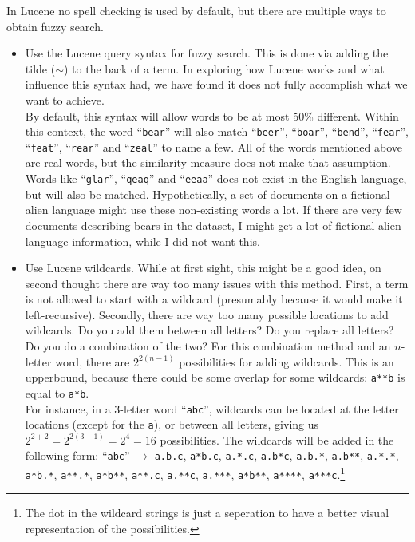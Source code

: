 \documentclass[11pt]{article}
\begin{document}
In Lucene no spell checking is used by default, but there are multiple ways to obtain fuzzy search.
\begin{itemize}
    \item Use the Lucene query syntax for fuzzy search. This is done via adding the tilde ($\sim$) to the back of a term. In exploring how Lucene works and what influence this syntax had, we have found it does not fully accomplish what we want to achieve.\\
    By default, this syntax will allow words to be at most 50\% different. Within this context, the word ``\texttt{bear}'' will also match ``\texttt{beer}'', ``\texttt{boar}'', ``\texttt{bend}'', ``\texttt{fear}'', ``\texttt{feat}'', ``\texttt{rear}'' and ``\texttt{zeal}'' to name a few. All of the words mentioned above are real words, but the similarity measure does not make that assumption. Words like ``\texttt{glar}'', ``\texttt{qeaq}'' and ``\texttt{eeaa}'' does not exist in the English language, but will also be matched. Hypothetically, a set of documents on a fictional alien language might use these non-existing words a lot. If there are very few documents describing bears in the dataset, I might get a lot of fictional alien language information, while I did not want this.
    \item Use Lucene wildcards. While at first sight, this might be a good idea, on second thought there are way too many issues with this method. First, a term is not allowed to start with a wildcard (presumably because it would make it left-recursive). Secondly, there are way too many possible locations to add wildcards. Do you add them between all letters? Do you replace all letters? Do you do a combination of the two? For this combination method and an $n$-letter word, there are $2^{2(n - 1)}$ possibilities for adding wildcards. This is an upperbound, because there could be some overlap for some wildcards: \texttt{a**b} is equal to \texttt{a*b}.\\
    For instance, in a 3-letter word ``\texttt{abc}'', wildcards can be located at the letter locations (except for the \texttt{a}), or between all letters, giving us $2^{2+2} = 2^{2(3-1)} = 2^4 = 16$ possibilities. The wildcards will be added in the following form: ``\texttt{abc}'' $\rightarrow$ \texttt{a.b.c}, \texttt{a*b.c}, \texttt{a.*.c}, \texttt{a.b*c}, \texttt{a.b.*}, \texttt{a.b**}, \texttt{a.*.*}, \texttt{a*b.*}, \texttt{a**.*}, \texttt{a*b**}, \texttt{a**.c}, \texttt{a.**c}, \texttt{a.***}, \texttt{a*b**}, \texttt{a****}, \texttt{a***c}.\footnote{The dot in the wildcard strings is just a seperation to have a better visual representation of the possibilities.}

\end{itemize}
\end{document}
